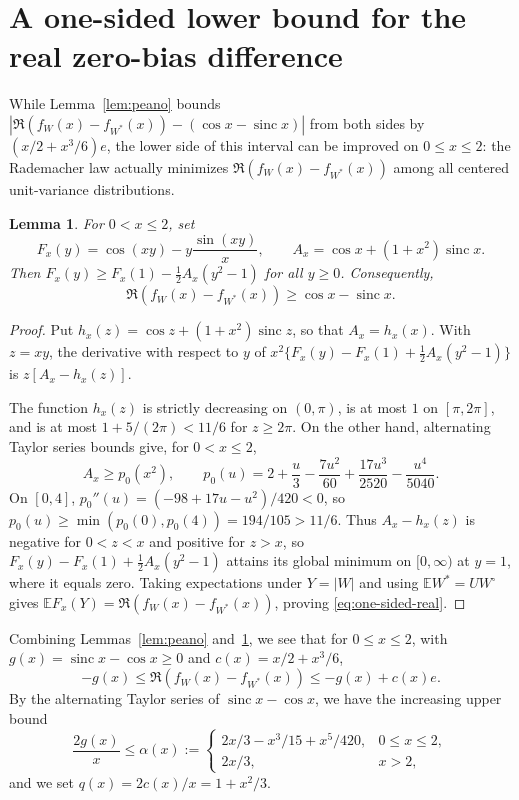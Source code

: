 \documentclass[11pt]{article}
\numberwithin{equation}{section}
\newtheorem{lemma}[theorem]{Lemma}
\theoremstyle{remark}
\DeclareMathOperator{\sinc}{sinc}
\newcommand{\E}{\mathbb E}
\begin{document}
\section{A one-sided lower bound for the real zero-bias difference}\label{sec:quadratic}

While Lemma~\ref{lem:peano} bounds $|\Re(f_W(x)-f_{W^*}(x))-(\cos x-\sinc x)|$
from both sides by $(x/2+x^3/6)e$, the lower side of this interval can be
improved on $0\le x\le2$: the Rademacher law actually minimizes
$\Re(f_W(x)-f_{W^*}(x))$ among all centered unit-variance distributions.

\begin{lemma}\label{lem:supporting-quadratic}
For $0<x\le2$, set
\[
 F_x(y)=\cos(xy)-y\frac{\sin(xy)}x,\qquad
 A_x=\cos x+(1+x^2)\sinc x.
\]
Then $F_x(y)\ge F_x(1)-\frac12A_x(y^2-1)$ for all $y\ge0$. Consequently,
\begin{equation}\label{eq:one-sided-real}
 \Re(f_W(x)-f_{W^*}(x))\ge\cos x-\sinc x.
\end{equation}
\end{lemma}
\begin{proof}
Put $h_x(z)=\cos z+(1+x^2)\sinc z$, so that $A_x=h_x(x)$. With $z=xy$, the
derivative with respect to $y$ of $x^2\{F_x(y)-F_x(1)+\frac12A_x(y^2-1)\}$
is $z[A_x-h_x(z)]$.

The function $h_x(z)$ is strictly decreasing on $(0,\pi)$, is at most $1$ on
$[\pi,2\pi]$, and is at most $1+5/(2\pi)<11/6$ for $z\ge2\pi$. On the other
hand, alternating Taylor series bounds give, for $0<x\le2$,
\[
 A_x\ge p_0(x^2),\qquad
 p_0(u)=2+\frac u3-\frac{7u^2}{60}+\frac{17u^3}{2520}-\frac{u^4}{5040}.
\]
On $[0,4]$, $p_0''(u)=(-98+17u-u^2)/420<0$, so $p_0(u)\ge\min(p_0(0),p_0(4))=194/105>11/6$.
Thus $A_x-h_x(z)$ is negative for $0<z<x$ and positive for $z>x$, so
$F_x(y)-F_x(1)+\frac12A_x(y^2-1)$ attains its global minimum on $[0,\infty)$
at $y=1$, where it equals zero. Taking expectations under $Y=|W|$ and using
$\E W^*=UW^\square$ gives $\E F_x(Y)=\Re(f_W(x)-f_{W^*}(x))$, proving
\eqref{eq:one-sided-real}.
\end{proof}

Combining Lemmas~\ref{lem:peano} and~\ref{lem:supporting-quadratic}, we see
that for $0\le x\le2$, with $g(x)=\sinc x-\cos x\ge0$ and $c(x)=x/2+x^3/6$,
\begin{equation}\label{eq:real-interval}
 -g(x)\le\Re(f_W(x)-f_{W^*}(x))\le-g(x)+c(x)e.
\end{equation}
By the alternating Taylor series of $\sinc x-\cos x$, we have the increasing
upper bound
\begin{equation}\label{eq:alpha}
 \frac{2g(x)}{x}\le\alpha(x):=
 \begin{cases}
  2x/3-x^3/15+x^5/420,&0\le x\le2,\\
  2x/3,&x>2,
 \end{cases}
\end{equation}
and we set $q(x)=2c(x)/x=1+x^2/3$.
\end{document}
